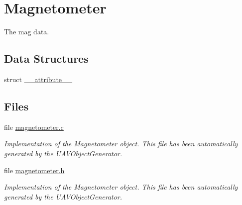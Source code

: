 \hypertarget{group___magnetometer}{\section{\-Magnetometer}
\label{group___magnetometer}
}


\-The mag data.  


\subsection*{\-Data \-Structures}
\begin{DoxyCompactItemize}
\item 
struct \hyperlink{struct____attribute____}{\-\_\-\-\_\-attribute\-\_\-\-\_\-}
\end{DoxyCompactItemize}
\subsection*{\-Files}
\begin{DoxyCompactItemize}
\item 
file \hyperlink{magnetometer_8c}{magnetometer.\-c}
\begin{DoxyCompactList}\small\item\em \-Implementation of the \-Magnetometer object. \-This file has been automatically generated by the \-U\-A\-V\-Object\-Generator. \end{DoxyCompactList}\item 
file \hyperlink{magnetometer_8h}{magnetometer.\-h}
\begin{DoxyCompactList}\small\item\em \-Implementation of the \-Magnetometer object. \-This file has been automatically generated by the \-U\-A\-V\-Object\-Generator. \end{DoxyCompactList}\end{DoxyCompactItemize}
